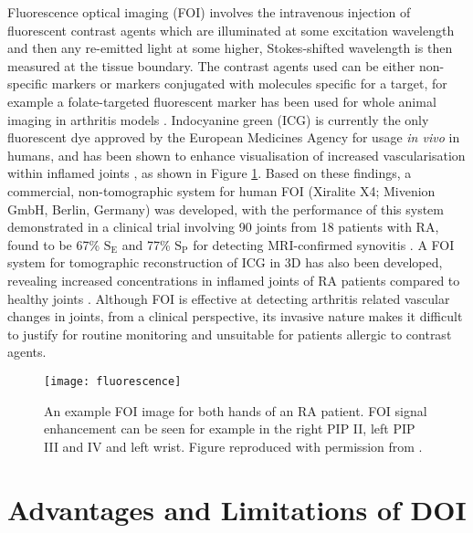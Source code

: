 \documentclass[twoside]{bhamthesis}
\theoremstyle{definition}
\begin{document}
Fluorescence optical imaging (FOI) involves the intravenous injection of fluorescent contrast agents which are illuminated at some excitation wavelength and then any re-emitted light at some higher, Stokes-shifted wavelength is then measured at the tissue boundary. The contrast agents used can be either non-specific markers or markers conjugated with molecules specific for a target, for example a folate-targeted fluorescent marker has been used for whole animal imaging in arthritis models \cite{chen2005arthritis}. Indocyanine green (ICG) is currently the only fluorescent dye approved by the European Medicines Agency for usage \textit{in vivo} in humans, and has been shown to enhance visualisation of increased vascularisation within inflamed joints \cite{werner2012inflammation}, as shown in Figure \ref{fig:fluorescence}. Based on these findings, a commercial, non-tomographic system for human FOI (Xiralite X4; Mivenion GmbH, Berlin, Germany) was developed, with the performance of this system demonstrated in a clinical trial involving 90 joints from 18 patients with RA, found to be 67\% $\mathrm{S_E}$ and 77\% $\mathrm{S_P}$ for detecting MRI-confirmed synovitis \cite{schafer2013quantitative}. A FOI system for tomographic reconstruction of ICG in 3D has also been developed, revealing increased concentrations in inflamed joints of RA patients compared to healthy joints \cite{mohajerani2014fluorescence}. Although FOI is effective at detecting arthritis related vascular changes in joints, from a clinical perspective, its invasive nature makes it difficult to justify for routine monitoring and unsuitable for patients allergic to contrast agents.

\begin{figure}[!ht]
\centering\texttt{[image: fluorescence]}\caption{An example FOI image  for both hands of an RA patient. FOI signal enhancement can be seen for example in the right PIP II, left PIP III and IV and left wrist. Figure reproduced with permission from \cite{werner2012inflammation}.}
  \label{fig:fluorescence}
\end{figure}

\section{Advantages and Limitations of DOI}
\end{document}
